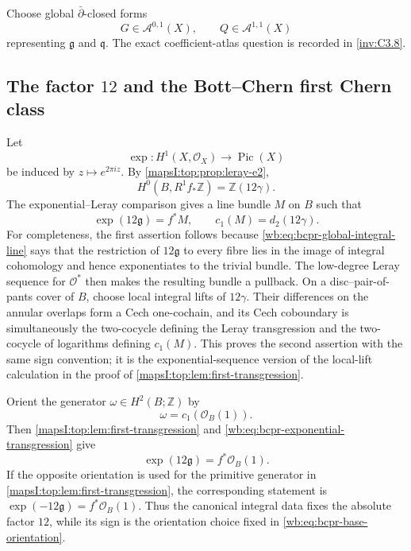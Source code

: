 Choose global $\bar\partial$-closed forms
\begin{equation}
 G\in\mathcal A^{0,1}(X),\qquad Q\in\mathcal A^{1,1}(X)
\label{wb:eq:bcpr-global-representatives}
\end{equation}
representing $\mathfrak g$ and $\mathfrak q$. The exact coefficient-atlas
question is recorded in \cref{inv:C3.8}.


\subsection{The factor \texorpdfstring{$12$}{12} and the Bott--Chern first Chern class}

Let
\[
 \exp\colon H^1(X,\mathcal O_X)\longrightarrow\operatorname{Pic}(X)
\]
be induced by $z\mapsto e^{2\pi iz}$.  By
\cref{mapsI:top:prop:leray-e2},
\begin{equation}
 H^0(B,R^1f_*\mathbb Z)=\mathbb Z(12\gamma).
\label{wb:eq:bcpr-global-integral-line}
\end{equation}
The exponential--Leray comparison gives a line bundle $M$ on $B$ such
that
\begin{equation}
 \exp(12\mathfrak g)=f^*M,
 \qquad c_1(M)=d_2(12\gamma).
\label{wb:eq:bcpr-exponential-transgression}
\end{equation}
For completeness, the first assertion follows because
\cref{wb:eq:bcpr-global-integral-line} says that the restriction of
$12\mathfrak g$ to every fibre lies in the image of integral cohomology
and hence exponentiates to the trivial bundle.  The low-degree Leray
sequence for $\mathcal O^*$ then makes the resulting bundle a pullback.
On a disc--pair-of-pants cover of $B$, choose local integral lifts of
$12\gamma$.  Their differences on the annular overlaps form a Cech
one-cochain, and its Cech coboundary is simultaneously the two-cocycle
defining the Leray transgression and the two-cocycle of logarithms defining
$c_1(M)$.  This proves the second assertion with the same sign convention;
it is the exponential-sequence version of the local-lift calculation in
the proof of \cref{mapsI:top:lem:first-transgression}.

Orient the generator $\omega\in H^2(B;\mathbb Z)$ by
\begin{equation}
 \omega=c_1(\mathcal O_B(1)).
\label{wb:eq:bcpr-base-orientation}
\end{equation}
Then \cref{mapsI:top:lem:first-transgression} and
\cref{wb:eq:bcpr-exponential-transgression} give
\begin{equation}
 \exp(12\mathfrak g)=f^*\mathcal O_B(1).
\label{wb:eq:bcpr-factor-twelve}
\end{equation}
If the opposite orientation is used for the primitive generator in
\cref{mapsI:top:lem:first-transgression}, the corresponding statement is
$\exp(-12\mathfrak g)=f^*\mathcal O_B(1)$.  Thus the canonical integral
data fixes the absolute factor $12$, while its sign is the orientation
choice fixed in \cref{wb:eq:bcpr-base-orientation}.

